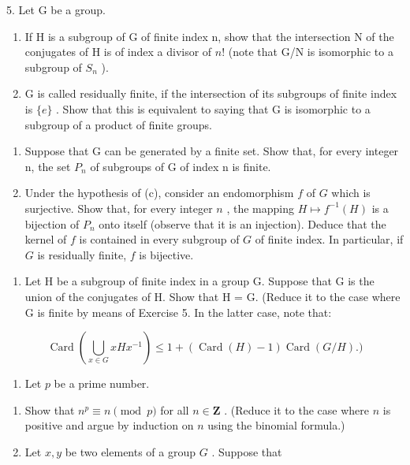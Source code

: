 5. Let G be a group.

\begin{enumerate}
\def\labelenumi{(\alph{enumi})}
\item
  If H is a subgroup of G of finite index n, show that the intersection N of the conjugates of H is of index a divisor of \(n!\) (note that G/N is isomorphic to a subgroup of \(S_{n}\) ).
\item
  G is called residually finite, if the intersection of its subgroups of finite index is \(\{e\}\) . Show that this is equivalent to saying that G is isomorphic to a subgroup of a product of finite groups.
\end{enumerate}
\relax{}
\begin{enumerate}
\def\labelenumi{(\alph{enumi})}
\setcounter{enumi}{2}
\item
  Suppose that G can be generated by a finite set. Show that, for every integer n, the set \(P_{n}\) of subgroups of G of index n is finite.
\item
  Under the hypothesis of (c), consider an endomorphism \(f\) of \(G\) which is surjective. Show that, for every integer \(n\) , the mapping \(H \mapsto f^{-1}(H)\) is a bijection of \(P_n\) onto itself (observe that it is an injection). Deduce that the kernel of \(f\) is contained in every subgroup of \(G\) of finite index. In particular, if \(G\) is residually finite, \(f\) is bijective.
\end{enumerate}

\begin{enumerate}
\def\labelenumi{\arabic{enumi}.}
\setcounter{enumi}{5}
\tightlist
\item
  Let H be a subgroup of finite index in a group G. Suppose that G is the union of the conjugates of H. Show that H = G. (Reduce it to the case where G is finite by means of Exercise 5. In the latter case, note that:
\end{enumerate}

\[
\operatorname{Card} \left(\bigcup_ {x \in G} x H x ^ {- 1}\right) \leqslant 1 + (\operatorname{Card} (H) - 1) \operatorname{Card} (G / H).)
\]

\begin{enumerate}
\def\labelenumi{\arabic{enumi}.}
\setcounter{enumi}{6}
\tightlist
\item
  Let \(p\) be a prime number.
\end{enumerate}

\begin{enumerate}
\def\labelenumi{(\alph{enumi})}
\item
  Show that \(n^p \equiv n \pmod{p}\) for all \(n \in \mathbf{Z}\) . (Reduce it to the case where \(n\) is positive and argue by induction on \(n\) using the binomial formula.)
\item
  Let \(x, y\) be two elements of a group \(G\) . Suppose that
\end{enumerate}

